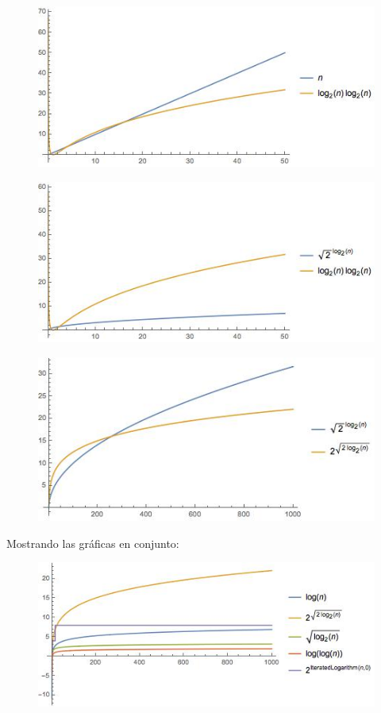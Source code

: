 \documentclass[11 pt, a4paper]{article}
\theoremstyle{definition}
\begin{document}
\begin{enumerate}
\begin{figure}[H]
         \centering
          \includegraphics[trim=0cm 0cm 0cm 0cm, width=12cm]{17.jpg} 
      \end{figure} \begin{figure}[H]
         \centering
          \includegraphics[trim=0cm 0cm 0cm 0cm, width=12cm]{18.jpg} 
      \end{figure} \begin{figure}[H]
         \centering
          \includegraphics[trim=0cm 0cm 0cm 0cm, width=12cm]{19.jpg} 
      \end{figure} 
      Mostrando las gráficas en conjunto:
      \begin{figure}[H]
         \centering
          \includegraphics[trim=0cm 0cm 0cm 0cm, width=15cm]{todas.jpg} 

\end{figure}
\end{enumerate}
\end{document}

